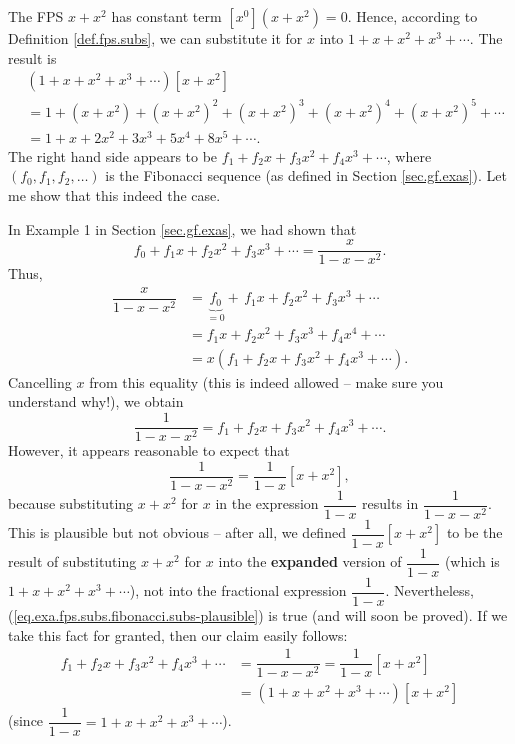 \begin{example}
\label{exa.fps.subs.fibonacci}The FPS $x+x^{2}$ has constant term $\left[
x^{0}\right]  \left(  x+x^{2}\right)  =0$. Hence, according to Definition
\ref{def.fps.subs}, we can substitute it for $x$ into $1+x+x^{2}+x^{3}+\cdots
$. The result is%
\begin{align*}
&  \left(  1+x+x^{2}+x^{3}+\cdots\right)  \left[  x+x^{2}\right] \\
&  =1+\left(  x+x^{2}\right)  +\left(  x+x^{2}\right)  ^{2}+\left(
x+x^{2}\right)  ^{3}+\left(  x+x^{2}\right)  ^{4}+\left(  x+x^{2}\right)
^{5}+\cdots\\
&  =1+x+2x^{2}+3x^{3}+5x^{4}+8x^{5}+\cdots.
\end{align*}
The right hand side appears to be $f_{1}+f_{2}x+f_{3}x^{2}+f_{4}x^{3}+\cdots$,
where $\left(  f_{0},f_{1},f_{2},\ldots\right)  $ is the Fibonacci sequence
(as defined in Section \ref{sec.gf.exas}). Let me show that this indeed the case.

In Example 1 in Section \ref{sec.gf.exas}, we had shown that%
\[
f_{0}+f_{1}x+f_{2}x^{2}+f_{3}x^{3}+\cdots=\dfrac{x}{1-x-x^{2}}.
\]
Thus,%
\begin{align*}
\dfrac{x}{1-x-x^{2}}  &  =\underbrace{f_{0}}_{=0}+\,f_{1}x+f_{2}x^{2}%
+f_{3}x^{3}+\cdots\\
&  =f_{1}x+f_{2}x^{2}+f_{3}x^{3}+f_{4}x^{4}+\cdots\\
&  =x\left(  f_{1}+f_{2}x+f_{3}x^{2}+f_{4}x^{3}+\cdots\right)  .
\end{align*}
Cancelling $x$ from this equality (this is indeed allowed -- make sure you
understand why!), we obtain%
\[
\dfrac{1}{1-x-x^{2}}=f_{1}+f_{2}x+f_{3}x^{2}+f_{4}x^{3}+\cdots.
\]
However, it appears reasonable to expect that
\begin{equation}
\dfrac{1}{1-x-x^{2}}=\dfrac{1}{1-x}\left[  x+x^{2}\right]  ,
\label{eq.exa.fps.subs.fibonacci.subs-plausible}%
\end{equation}
because substituting $x+x^{2}$ for $x$ in the expression $\dfrac{1}{1-x}$
results in $\dfrac{1}{1-x-x^{2}}$. This is plausible but not obvious -- after
all, we defined $\dfrac{1}{1-x}\left[  x+x^{2}\right]  $ to be the result of
substituting $x+x^{2}$ for $x$ into the \textbf{expanded} version of
$\dfrac{1}{1-x}$ (which is $1+x+x^{2}+x^{3}+\cdots$), not into the fractional
expression $\dfrac{1}{1-x}$. Nevertheless,
(\ref{eq.exa.fps.subs.fibonacci.subs-plausible}) is true (and will soon be
proved). If we take this fact for granted, then our claim easily follows:%
\begin{align*}
f_{1}+f_{2}x+f_{3}x^{2}+f_{4}x^{3}+\cdots &  =\dfrac{1}{1-x-x^{2}}=\dfrac
{1}{1-x}\left[  x+x^{2}\right] \\
&  =\left(  1+x+x^{2}+x^{3}+\cdots\right)  \left[  x+x^{2}\right]
\end{align*}
(since $\dfrac{1}{1-x}=1+x+x^{2}+x^{3}+\cdots$).
\end{example}


